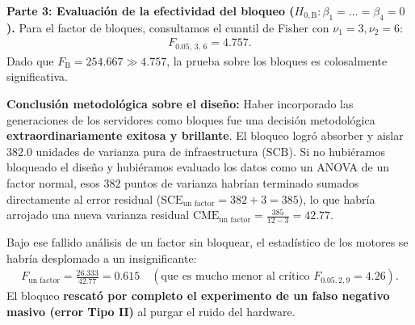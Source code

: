 \begin{solproblema}
	\textbf{Parte 3: Evaluación de la efectividad del bloqueo ($H_{0,\text{B}}: \beta_1 = \ldots = \beta_4 = 0$).}
	Para el factor de bloques, consultamos el cuantil de Fisher con $\nu_1 = 3, \nu_2 = 6$:
	\begin{align}
		F_{0.05, \, 3, \, 6} = 4.757.
	\end{align}
	Dado que $F_{\text{B}} = 254.667 \gg 4.757$, la prueba sobre los bloques es colosalmente significativa. 
	
	\textbf{Conclusión metodológica sobre el diseño:} Haber incorporado las generaciones de los servidores como bloques fue una decisión metodológica \textbf{extraordinariamente exitosa y brillante}. El bloqueo logró absorber y aislar $382.0$ unidades de varianza pura de infraestructura ($\text{SCB}$). Si no hubiéramos bloqueado el diseño y hubiéramos evaluado los datos como un ANOVA de un factor normal, esos $382$ puntos de varianza habrían terminado sumados directamente al error residual ($\text{SCE}_{\text{un factor}} = 382 + 3 = 385$), lo que habría arrojado una nueva varianza residual $\text{CME}_{\text{un factor}} = \frac{385}{12-3} = 42.77$. 
	
	Bajo ese fallido análisis de un factor sin bloquear, el estadístico de los motores se habría desplomado a un insignificante:
	\begin{align}
		F_{\text{un factor}} = \frac{26.333}{42.77} = 0.615 \quad (\text{que es mucho menor al crítico } F_{0.05, 2, 9} = 4.26).
	\end{align}
	El bloqueo \textbf{rescató por completo el experimento de un falso negativo masivo (error Tipo II)} al purgar el ruido del hardware.
\end{solproblema}

